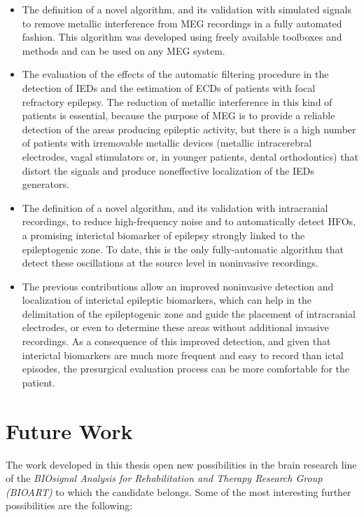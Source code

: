\begin{itemize}
\item The definition of a novel algorithm, and its validation with simulated signals to remove metallic interference from MEG recordings in a fully automated fashion. This algorithm was developed using freely available toolboxes and methods and can be used on any MEG system. 

\item The evaluation of the effects of the automatic filtering procedure in the detection of IEDs and the estimation of ECDs of patients with focal refractory epilepsy. The reduction of metallic interference in this kind of patients is essential, because the purpose of MEG is to provide a reliable detection of the areas producing epileptic activity, but there is a high number of patients with irremovable metallic devices (metallic intracerebral electrodes, vagal stimulators or, in younger patients, dental orthodontics) that distort the signals and produce noneffective localization of the IEDs generators.

\item The definition of a novel algorithm, and its validation with intracranial recordings, to reduce high-frequency noise and to automatically detect HFOs, a promising interictal biomarker of epilepsy strongly linked to the epileptogenic zone. To date, this is the only fully-automatic algorithm that detect these oscillations at the source level in noninvasive recordings. 

\item The previous contributions allow an improved noninvasive detection and localization of interictal epileptic biomarkers, which can help in the delimitation of the epileptogenic zone and guide the placement of intracranial electrodes, or even to determine these areas without additional invasive recordings. As a consequence of this improved detection, and given that interictal biomarkers are much more frequent and easy to record than ictal episodes, the presurgical evaluation process can be more comfortable for the patient. 

\end{itemize}

\section{Future Work}
\label{sec:fw}
The work developed in this thesis open new possibilities in the brain research line of the \emph{BIOsignal Analysis for Rehabilitation and Therapy Research Group (BIOART)} to which the candidate belongs. Some of the most interesting further possibilities are the following: 


